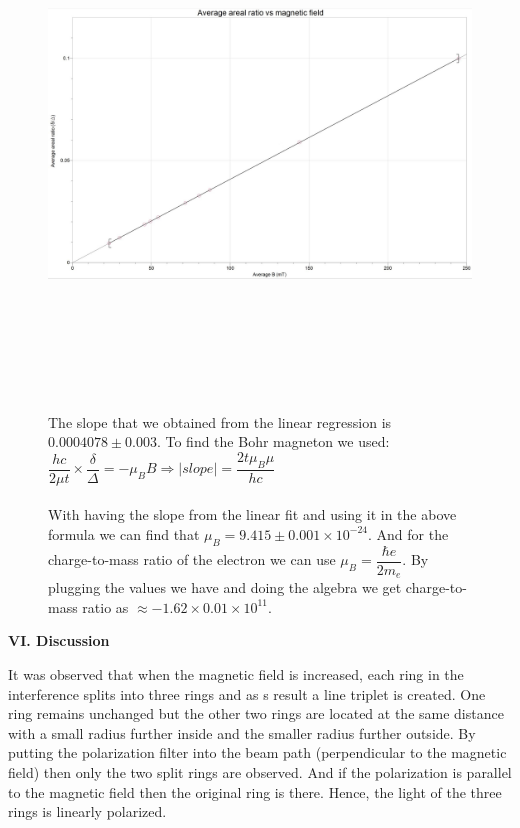 \documentclass[fleqn]{article}
\begin{document}
  \begin{figure}[h!]
    \includegraphics[height=14cm, width=16cm]{Figure3.JPG}
    \caption{
      The slope that we obtained from the linear regression is $0.0004078 \pm 0.003$. To find the Bohr magneton
      we used:
      \\
      $
        \dfrac{hc}{2 \mu t} \times \dfrac{\delta}{\Delta}=-\mu_B B 
        \Longrightarrow |slope|=\dfrac{2t \mu_B \mu}{hc}
      $
      \\
      \\
      With having the slope from the linear fit and using it in the above formula we can find that 
      $\mu_B=9.415 \pm 0.001 \times 10^{-24}$.
      And for the charge-to-mass ratio of the electron we can use $\mu_B=\dfrac{\hbar e}{2 m_e}$. By plugging the values 
      we have and doing the algebra we get charge-to-mass ratio as $\approx -1.62 \times 0.01 \times 10^{11}$.
    }
  \end{figure}


  \pagebreak

  \textbf{VI. Discussion}

  \vspace{10px}

  It was observed that when the magnetic field is increased, each ring in the interference splits into three rings and as s result a line
  triplet is created. One ring remains unchanged but the other two rings are located at the same distance with a small radius further 
  inside and the smaller radius further outside. By putting the polarization filter into the beam path (perpendicular to the magnetic field)
  then only the two split rings are observed. And if the polarization is parallel to the magnetic field then the original ring is there. Hence,
  the light of the three rings is linearly polarized.
\end{document}
